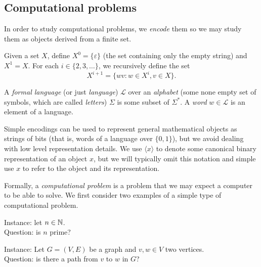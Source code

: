 \subsection{Computational problems}

In order to study computational problems, we \emph{encode} them so we may study them as objects derived from a finite set. 

\begin{definition} \label{def:kleene-star}
    Given a set $X$, define $X^0 = \{\varepsilon\}$ (the set containing only the empty string) and $X^1 = X$.
    For each $i \in \{2, 3, \ldots\}$, we recursively define the set
    \[ X^{i+1} = \{wv: w \in X^i, v \in X\}. \]
\end{definition}

\begin{definition} \label{def:formal-language}
    A \emph{formal language} (or just \emph{language}) $\mathcal L$ over an \emph{alphabet} (some none empty set of symbols, which are called \emph{letters}) $\Sigma$ is some subset of $\Sigma^*$. A \emph{word} $w \in \mathcal L$ is an element of a language.
\end{definition}

Simple encodings can be used to represent general mathematical objects as strings of bits (that is, words of a language over $\{0,1\}$), but we avoid dealing with low level representation details. We use $\langle x \rangle$ to denote some canonical binary representation of an object $x$, but we will typically omit this notation and simple use $x$ to refer to the object and its representation.

Formally, a \emph{computational problem} is a problem that we may expect a computer to be able to solve. We first consider two examples of a simple type of computational problem.

\begin{problem} \label{ex:primality}
    Instance: let $n \in \mathbb N$. \\
    Question: is $n$ prime?
\end{problem}

\begin{problem} \label{ex:reachability}
    Instance: Let $G = (V,E)$ be a graph and $v,w \in V$ two vertices.  \\
    Question: is there a path from $v$ to $w$ in $G$?
\end{problem}

